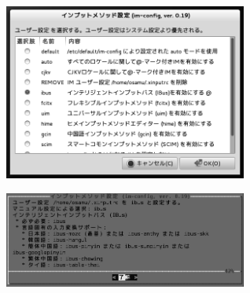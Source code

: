 \documentclass[mingoth,a4paper]{jsarticle}
\begin{document}
{{{{{{{{{{{{{\begin{figure}[htbp]
 \begin{minipage}{0.5\hsize}
  \begin{center}
   \includegraphics[width=8cm]{image201212/im06_mono.png}
  \end{center}
  \label{fig:one}
 \end{minipage}
 \begin{minipage}{0.5\hsize}
  \begin{center}
   \includegraphics[width=8cm]{image201212/im07_mono.png}
  \end{center}
  \label{fig:two}
 \end{minipage}
\end{figure}

}}}}}}}}}}}}}
\end{document}
